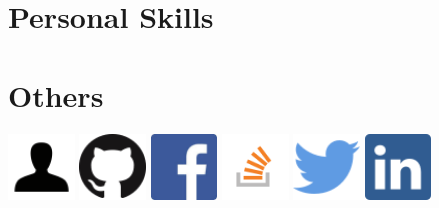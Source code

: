 \documentclass[11pt,a4paper,sans]{moderncv} %
\begin{document}
\section{Personal Skills}
\renewcommand{\listitemsymbol}{-~}


\section{Others}
\centerline{
\href{https://lucax88x.github.io}{\includegraphics[width=50pt]{profile}}
\quad
\href{https://github.com/lucax88x}{\includegraphics[width=50pt]{github}}
\quad
\href{https://facebook.com/luca.trazzi}{\includegraphics[width=50pt]{facebook}}
\quad
\href{http://stackoverflow.com/users/127041/luca-trazzi}{\includegraphics[width=50pt]{stackoverflow}}
\quad
\href{https://twitter.com/LucaTrazzi}{\includegraphics[width=50pt]{twitter}}
\quad
\href{https://www.linkedin.com/in/luca-trazzi-93217931}{\includegraphics[width=50pt]{linkedin}}
}
\end{document}

